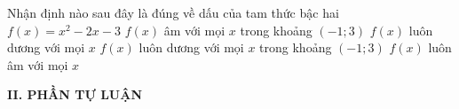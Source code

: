 \begin{ex}%
Nhận định nào sau đây là đúng về dấu của tam thức bậc hai $f(x)=x^2-2x-3$
	\choice	
	{\True $f(x)$ âm với mọi $x$ trong khoảng $(-1;3)$}
	{$f(x)$ luôn dương với mọi $x$}
	{$f(x)$ luôn dương với mọi $x$ trong khoảng $(-1;3)$}
	{$f(x)$ luôn âm với mọi $x$}	
\end{ex}
\noindent\textbf{II. PHẦN TỰ LUẬN}
